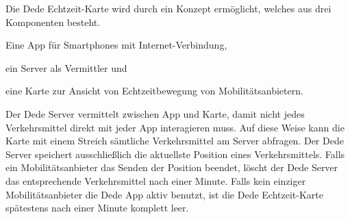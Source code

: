 
Die Dede Echtzeit-Karte wird durch ein Konzept ermöglicht, welches aus drei Komponenten besteht.

Eine App für Smartphones mit Internet-Verbindung,

ein Server als Vermittler und

eine Karte zur Ansicht von Echtzeitbewegung von Mobilitätsanbietern.

Der Dede Server vermittelt zwischen App und Karte, damit nicht jedes Verkehrsmittel direkt mit jeder App interagieren muss. Auf diese Weise kann die Karte mit einem Streich sämtliche Verkehrsmittel am Server abfragen. Der Dede Server speichert ausschließlich die aktuellste Position eines Verkehrsmittels. Falls ein Mobilitätsanbieter das Senden der Position beendet, löscht der Dede Server das entsprechende Verkehrsmittel nach einer Minute. Falls kein einziger Mobilitätsanbieter die Dede App aktiv benutzt, ist die Dede Echtzeit-Karte spätestens nach einer Minute komplett leer.
